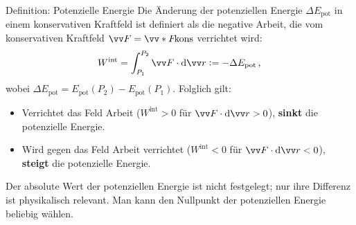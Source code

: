 \begin{importantbox}[]{Definition: Potenzielle Energie}
    Die Änderung der potenziellen Energie $\Delta E_{\text{pot}}$ in einem konservativen Kraftfeld ist definiert als die negative Arbeit, die vom konservativen Kraftfeld $\ivec{F} = \ivecS{F}{\text{kons}}$ verrichtet wird: 
    \begin{equation}\label{eq: potenzielle_energie_def}
        W^{\text{int}} = \int_{P_1}^{P_2} \ivec{F} \cdot \dd\ivec{r} \defeq -\Delta E_{\text{pot}}\mComma
    \end{equation}
    wobei $\Delta E_{\text{pot}} = E_{\text{pot}}(P_2) - E_{\text{pot}}(P_1) $. Folglich gilt:
    \begin{itemize}[itemsep=1.5pt]
        \item Verrichtet das Feld Arbeit ($W^{\text{int}} > 0$ für $\ivec{F} \cdot \dd \ivec{r} > 0$), \textbf{sinkt} die potenzielle Energie. 
        \item Wird gegen das Feld Arbeit verrichtet ($W^{\text{int}} < 0$ für $\ivec{F} \cdot \dd \ivec{r} < 0$), \textbf{steigt} die potenzielle Energie. 
    \end{itemize}
    Der absolute Wert der potenziellen Energie ist nicht festgelegt; nur ihre Differenz ist physikalisch relevant. Man kann den Nullpunkt der potenziellen Energie beliebig wählen. 
\end{importantbox}

